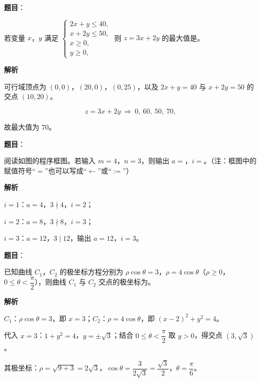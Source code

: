 \begin{answer}

\textbf{题目}：

若变量 $x$，$y$ 满足 $\begin{cases}2x+y\leqslant40,\\ x+2y\leqslant50,\\ x\geqslant0,\\ y\geqslant0,\end{cases}$ 则 $z=3x+2y$ 的最大值是\gkblank{}。

\textbf{解析}

可行域顶点为 $(0,0)$，$(20,0)$，$(0,25)$，以及 $2x+y=40$ 与 $x+2y=50$ 的交点 $(10,20)$。

\nopagebreak[4]
\[z=3x+2y\ \Rightarrow\ 0,\ 60,\ 50,\ 70,\]

故最大值为 $70$。


\end{answer}
\begin{answer}

\textbf{题目}：

阅读如图的程序框图。若输入 $m=4$，$n=3$，则输出 $a=$\gkblank{}，$i=$\gkblank{}。（注：框图中的赋值符号“$=$”也可以写成“$\leftarrow$”或“$:=$”）
\nopagebreak[4]
\begin{center}\end{center}
\nopagebreak[4]
\textbf{解析}

$i=1$：$a=4$，$3\nmid4$，$i=2$；

$i=2$：$a=8$，$3\nmid8$，$i=3$；

$i=3$：$a=12$，$3\mid12$，输出 $a=12$，$i=3$。


\end{answer}
\begin{answer}

\textbf{题目}：

已知曲线 $C_1$，$C_2$ 的极坐标方程分别为 $\rho\cos\theta=3$，$\rho=4\cos\theta$（$\rho\geqslant0$，$0\leqslant\theta<\dfrac{\pi}{2}$），则曲线 $C_1$ 与 $C_2$ 交点的极坐标为\gkblank{}。

\textbf{解析}

$C_1$：$\rho\cos\theta=3$，即 $x=3$；$C_2$：$\rho=4\cos\theta$，即 $(x-2)^2+y^2=4$。

代入 $x=3$：$1+y^2=4$，$y=\pm\sqrt3$；结合 $0\leqslant\theta<\dfrac{\pi}2$ 取 $y>0$，得交点 $(3,\sqrt3)$。

其极坐标：$\rho=\sqrt{9+3}=2\sqrt3$，$\cos\theta=\dfrac3{2\sqrt3}=\dfrac{\sqrt3}2$，$\theta=\dfrac{\pi}6$。


\end{answer}
